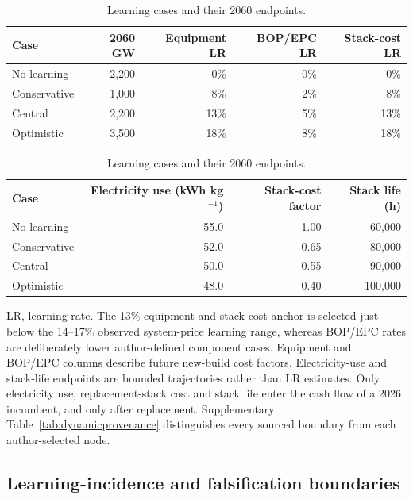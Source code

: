 \documentclass[pdflatex,sn-nature]{sn-jnl}
\begin{document}
\begin{table}[!ht]
\caption{Learning cases and their 2060 endpoints.}\label{tab:learning}
\centering
\footnotesize
\begin{tabular}{lrrrr}
\toprule
Case & 2060 GW & Equipment LR & BOP/EPC LR & Stack-cost LR \\
\midrule
No learning & 2,200 & 0\% & 0\% & 0\% \\
Conservative & 1,000 & 8\% & 2\% & 8\% \\
Central & 2,200 & 13\% & 5\% & 13\% \\
Optimistic & 3,500 & 18\% & 8\% & 18\% \\
\bottomrule
\end{tabular}
\par\vspace{5pt}
\begin{tabular}{lrrr}
\toprule
Case & Electricity use (kWh kg$^{-1}$) & Stack-cost factor & Stack life (h) \\
\midrule
No learning & 55.0 & 1.00 & 60,000 \\
Conservative & 52.0 & 0.65 & 80,000 \\
Central & 50.0 & 0.55 & 90,000 \\
Optimistic & 48.0 & 0.40 & 100,000 \\
\bottomrule
\end{tabular}
\begin{flushleft}\footnotesize
LR, learning rate. The 13\% equipment and stack-cost anchor is selected just below the 14--17\% observed system-price learning range, whereas BOP/EPC rates are deliberately lower author-defined component cases\cite{glenk2023,ferioli2009}. Equipment and BOP/EPC columns describe future new-build cost factors. Electricity-use and stack-life endpoints are bounded trajectories rather than LR estimates\cite{doe2024,worldbank2026}. Only electricity use, replacement-stack cost and stack life enter the cash flow of a 2026 incumbent, and only after replacement. Supplementary Table~\ref{tab:dynamicprovenance} distinguishes every sourced boundary from each author-selected node.
\end{flushleft}
\end{table}
\FloatBarrier

\subsection{Learning-incidence and falsification boundaries}
\end{document}
